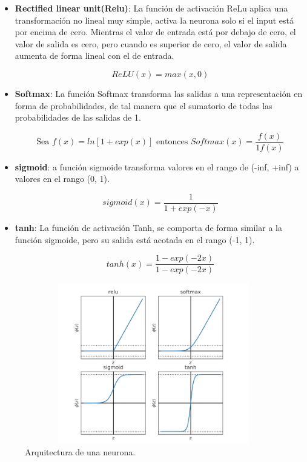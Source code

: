 \documentclass[11pt]{article} %
\begin{document}
\begin{itemize}
	\item \textbf{Rectified linear unit(Relu)}: La función de activación ReLu aplica una transformación no lineal muy simple, activa la neurona solo si el input está por encima de cero. Mientras el valor de entrada está por debajo de cero, el valor de salida es cero, pero cuando es superior de cero, el valor de salida aumenta de forma lineal con el de entrada.
	
	$$ ReLU(x) = max(x,0) $$
	
	\item \textbf{Softmax}: La función Softmax transforma las salidas a una representación en forma de probabilidades, de tal manera que el sumatorio de todas las probabilidades de las salidas de 1.
	
	$$ \text{Sea } f(x) = ln[1+exp(x)]  \text{ entonces } Softmax(x) = \dfrac{f(x)}{1  f(x)} $$
	
	\item \textbf{sigmoid}: a función sigmoide transforma valores en el rango de (-inf, +inf) a valores en el rango (0, 1).
	
		$$ sigmoid(x) = \dfrac{1}{1+exp(-x)} $$ 
	
	\item \textbf{tanh}: La función de activación Tanh, se comporta de forma similar a la función sigmoide, pero su salida está acotada en el rango (-1, 1).
	
	$$ tanh(x) = \dfrac{1 - exp(-2x)}{1-exp(-2x)} $$
	
	
\end{itemize}

\begin{figure}[h!]
	\centering
	\includegraphics[width=12cm, height=7cm]{funact.png}
	\caption{Arquitectura de una neurona.}
\end{figure}
\end{document}
